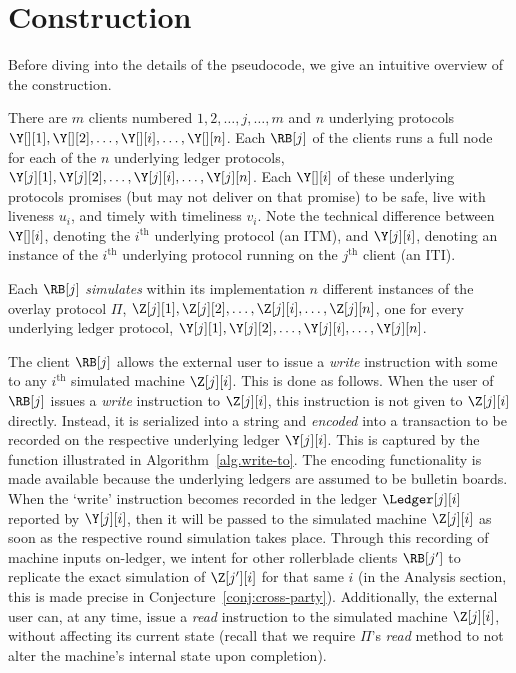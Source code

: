 \section{Construction}\label{sec:construction}

Before diving into the details of the pseudocode, we give an intuitive overview
of the \rollerblade construction.


There are $m$ \rollerblade clients numbered $1, 2,\allowbreak \ldots,\allowbreak j,\allowbreak \ldots,\allowbreak m$
and $n$ underlying protocols $\Y[][1], \Y[][2],\allowbreak \ldots,\allowbreak \Y[][i],\allowbreak \ldots,\allowbreak \Y[][n]$.
Each $\RB[j]$ of the clients runs a full node for each of the $n$ underlying
ledger protocols,
$\Y[j][1], \Y[j][2],\allowbreak\ldots,\allowbreak \Y[j][i],\allowbreak \ldots,\allowbreak \Y[j][n]$.
Each $\Y[][i]$ of these underlying protocols promises (but may not deliver on that promise)
to be safe, live with liveness $u_i$, and timely with timeliness $v_i$.
Note the technical difference between $\Y[][i]$, denoting the $i^\text{th}$ underlying protocol (an ITM),
and $\Y[j][i]$, denoting an instance of the $i^\text{th}$ underlying protocol running on the
$j^\text{th}$ client (an ITI).

Each $\RB[j]$ \emph{simulates} within its implementation $n$ different instances
of the overlay protocol $\Pi$,
$\Z[j][1], \Z[j][2],\allowbreak \ldots,\allowbreak \Z[j][i],\allowbreak \ldots,\allowbreak \Z[j][n]$,
one for every underlying ledger protocol,
$\Y[j][1], \Y[j][2],\allowbreak \ldots,\allowbreak \Y[j][i],\allowbreak \ldots,\allowbreak \Y[j][n]$.

The \rollerblade client $\RB[j]$ allows the external user to issue a \emph{write} instruction
with some \data
to any $i^\text{th}$ simulated machine $\Z[j][i]$. This is done as follows. When the user
of $\RB[j]$ issues a \emph{write} instruction to $\Z[j][i]$, this instruction is not given to
$\Z[j][i]$ directly. Instead, it is serialized into a string and \emph{encoded} into a transaction
to be recorded on the respective underlying ledger $\Y[j][i]$. This is captured by
the \writeToMachine function illustrated in Algorithm~\ref{alg.write-to}.
The encoding functionality is made available because
the underlying ledgers are assumed to be bulletin boards.
When the `write' instruction becomes recorded in the ledger $\Ledger[j][i]$ reported
by $\Y[j][i]$, then it will be passed to the simulated
machine $\Z[j][i]$ as soon as the respective round simulation takes place.
Through this recording of machine inputs on-ledger, we intent for other
rollerblade clients $\RB[j']$ to replicate the exact simulation of $\Z[j'][i]$ for that
same $i$ (in the Analysis section, this is made precise in Conjecture~\ref{conj:cross-party}).
Additionally, the external user can, at any time, issue a \emph{read} instruction to
the simulated machine $\Z[j][i]$, without affecting its current state (recall that we
require $\Pi$'s \emph{read} method to not alter the machine's internal state upon completion).

